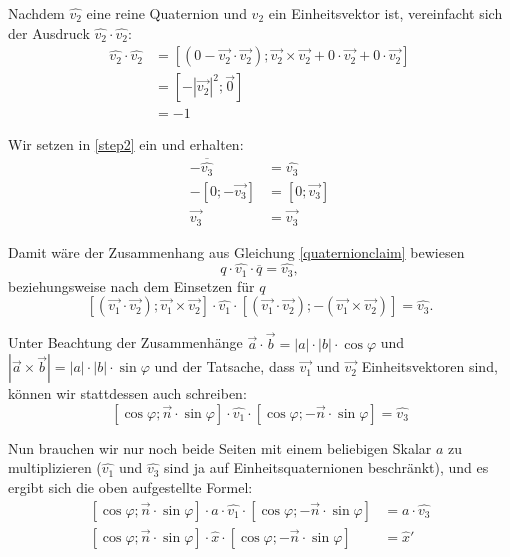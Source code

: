 Nachdem $\hat{v_2}$ eine reine Quaternion und $v_2$ ein Einheitsvektor ist, vereinfacht sich der Ausdruck $\hat{v_2} \cdot \hat{v_2}$:
\begin{equation}
\begin{split}
 \hat{v_2} \cdot \hat{v_2} &= \left[ \left( 0 - \vec{v_2} \cdot \vec{v_2} \right); \vec{v_2} \times \vec{v_2} + 0 \cdot \vec{v_2} + 0 \cdot \vec{v_2} \right] \\
 &= \left[ -\left| \vec{v_2} \right|^2; \vec 0 \right] \\
 &= -1
\end{split}
\end{equation}

Wir setzen in \ref{step2} ein und erhalten:
\begin{equation}
\begin{split}
 -\overline{\hat{v_3}} &= \hat{v_3} \\
 -\left[ 0; -\vec{v_3} \right] &= \left[ 0; \vec{v_3} \right] \\
 \vec{v_3} &= \vec{v_3}
\end{split}
\end{equation}

Damit wäre der Zusammenhang aus Gleichung \ref{quaternionclaim} bewiesen
\begin{equation*}
 q \cdot \hat{v_1} \cdot \overline{q} = \hat{v_3},
\end{equation*}
beziehungsweise nach dem Einsetzen für $q$
\begin{equation}
 \left[ ( \vec{v_1} \cdot \vec{v_2} ); \vec{v_1} \times \vec{v_2} \right] \cdot \hat{v_1} \cdot \left[ ( \vec{v_1} \cdot \vec{v_2} ); -(\vec{v_1} \times \vec{v_2} ) \right] = \hat{v_3}.
\end{equation} 

Unter Beachtung der Zusammenhänge $\vec a \cdot \vec b = \left| a \right| \cdot \left| b \right| \cdot \cos \varphi$ und $\left| \vec a \times \vec b \right| = \left| a \right| \cdot \left| b \right| \cdot \sin \varphi$ und der Tatsache, dass $\vec{v_1}$ und $\vec{v_2}$ Einheitsvektoren sind, können wir stattdessen auch schreiben:
\begin{equation}
 \left[ \cos \varphi; \vec n \cdot \sin \varphi \right] \cdot \hat{v_1} \cdot \left[ \cos \varphi; -\vec n \cdot \sin \varphi \right] = \hat{v_3}
\end{equation}

Nun brauchen wir nur noch beide Seiten mit einem beliebigen Skalar $a$ zu multiplizieren ($\hat{v_1}$ und $\hat{v_3}$ sind ja auf Einheitsquaternionen beschränkt), und es ergibt sich die oben aufgestellte Formel:
\begin{equation}
\begin{split}
 \left[ \cos \varphi; \vec n \cdot \sin \varphi \right] \cdot a \cdot \hat{v_1} \cdot \left[ \cos \varphi; -\vec n \cdot \sin \varphi \right] &= a \cdot \hat{v_3} \\
 \left[ \cos \varphi; \vec n \cdot \sin \varphi \right] \cdot \hat{x} \cdot \left[ \cos \varphi; -\vec n \cdot \sin \varphi \right] &= \hat{x}'
\end{split}
\end{equation}

